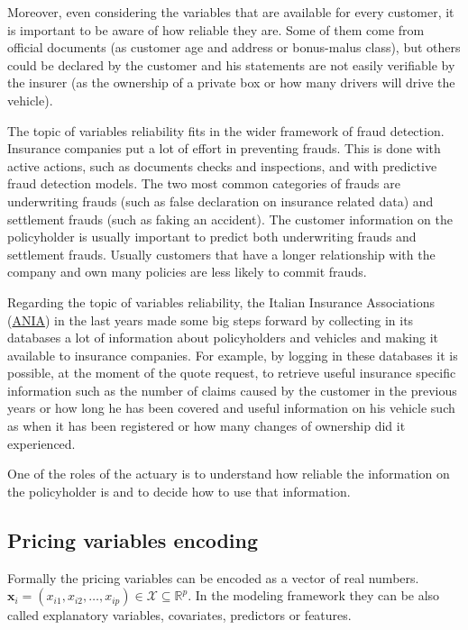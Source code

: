 \documentclass[a4paper, twoside, openright, 12pt]{report}
\theoremstyle{definition}
\theoremstyle{definition}
\theoremstyle{definition}
\theoremstyle{remark}
\begin{document}
Moreover, even considering the variables that are available for every customer, it is important to be aware of how reliable they are. Some of them come from official documents (as customer age and address or bonus-malus class), but others could be declared by the customer and his statements are not easily verifiable by the insurer (as the ownership of a private box or how many drivers will drive the vehicle).

The topic of variables reliability fits in the wider framework of fraud detection. Insurance companies put a lot of effort in preventing frauds. This is done with active actions, such as documents checks and inspections, and with predictive fraud detection models. The two most common categories of frauds are underwriting frauds (such as false declaration on insurance related data) and settlement frauds (such as faking an accident). The customer information on the policyholder is usually important to predict both underwriting frauds and settlement frauds. Usually customers that have a longer relationship with the company and own many policies are less likely to commit frauds.

Regarding the topic of variables reliability, the Italian Insurance Associations (\href{https://www.ania.it/}{ANIA}) in the last years made some big steps forward by collecting in its databases a lot of information about policyholders and vehicles and making it available to insurance companies. For example, by logging in these databases it is possible, at the moment of the quote request, to retrieve useful insurance specific information such as the number of claims caused by the customer in the previous years or how long he has been covered and useful information on his vehicle such as when it has been registered or how many changes of ownership did it experienced.

One of the roles of the actuary is to understand how reliable the information on the policyholder is and to decide how to use that information.

\hypertarget{chap:pricing-variables-encoding}{%
\subsection{Pricing variables encoding}\label{chap:pricing-variables-encoding}}

Formally the pricing variables can be encoded as a vector of real numbers. \(\boldsymbol{x}_i=(x_{i1}, x_{i2}, \dots, x_{ip})\in\mathcal{X}\subseteq\mathbb{R}^p\). In the modeling framework they can be also called explanatory variables, covariates, predictors or features.
\end{document}
